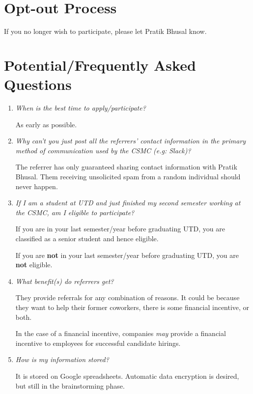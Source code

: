 \documentclass[letterpaper, 12pt]{article}
\newcommand{\QA}[2]{\textit{#1}\medskip

    #2\bigskip
}
\begin{document}
\section{Opt-out Process}

If you no longer wish to participate, please let Pratik Bhusal know.

\section{Potential/Frequently Asked Questions}

\begin{enumerate}[leftmargin=*]
    \item\QA%
        {When is the best time to apply/participate?}
        {As early as possible.}
    \item\QA%
        {%
            Why can't you just post all the referrers' contact information in
            the primary method of communication used by the CSMC (e.g: Slack)?
        }
        {%
            The referrer has only guaranteed sharing contact information with
            Pratik Bhusal. Them receiving unsolicited spam from a random
            individual should never happen.
        }
    \item\QA%
        {%
            If I am a student at UTD and just finished my second semester
            working at the CSMC, am I eligible to participate?
        }
        {%
            If you are in your last semester/year before graduating UTD, you are
            classified as a senior student and hence eligible.

            If you are \textbf{not} in your last semester/year before graduating
            UTD, you are \textbf{not} eligible.
        }
    \item\QA%
        {%
            What benefit(s) do referrers get?
        }
        {%
            They provide referrals for any combination of reasons. It could be
            because they want to help their former coworkers, there is some
            financial incentive, or both.

            In the case of a financial incentive, companies \textit{may} provide
            a financial incentive to employees for successful candidate hirings.
        }
    \item\QA%
        {How is my information stored?}
        {
            It is stored on Google spreadsheets. Automatic data encryption is
            desired, but still in the brainstorming phase.
        }
\end{enumerate}
\end{document}
